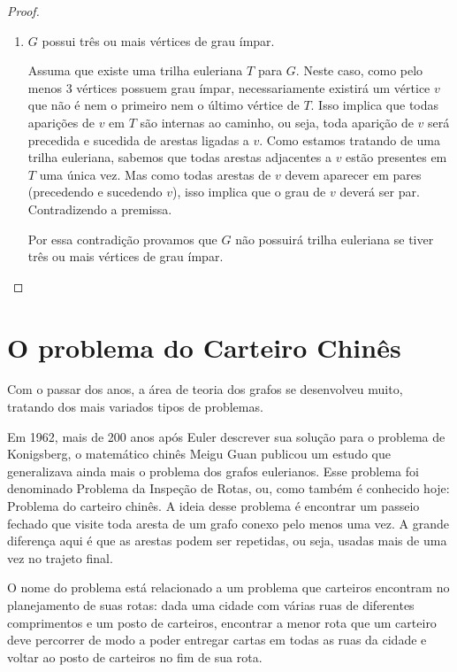 \documentclass{article}
\begin{document}
\begin{proof}
\begin{enumerate}
        \item $G$ possui três ou mais vértices de grau ímpar. 

			Assuma que existe uma trilha euleriana $T$ para $G$. 
			Neste caso, como pelo menos 3 vértices possuem grau ímpar, necessariamente existirá um vértice $v$ que não é nem o primeiro nem o último vértice de $T$.
			Isso implica que todas aparições de $v$ em $T$ são internas ao caminho, ou seja, toda aparição de $v$ será precedida e sucedida de arestas ligadas a $v$.
			Como estamos tratando de uma trilha euleriana, sabemos que todas arestas adjacentes a $v$ estão presentes em $T$ uma única vez. 
			Mas como todas arestas de $v$ devem aparecer em pares (precedendo e sucedendo $v$), isso implica que o grau de $v$ deverá ser par.
			Contradizendo a premissa.

			Por essa contradição provamos que $G$ não possuirá trilha euleriana se tiver três ou mais vértices de grau ímpar.
    \end{enumerate}
\end{proof}



%


\section{O problema do Carteiro Chinês}

Com o passar dos anos, a área de teoria dos grafos se desenvolveu muito, tratando dos mais variados tipos de problemas.

Em 1962, mais de 200 anos após Euler descrever sua solução para o problema de Konigsberg, o matemático chinês Meigu Guan publicou um estudo que generalizava ainda mais o problema dos grafos eulerianos. 
Esse problema foi denominado Problema da Inspeção de Rotas, ou, como também é conhecido hoje: Problema do carteiro chinês.
A ideia desse problema é encontrar um passeio fechado que visite toda aresta de um grafo conexo pelo menos uma vez. 
A grande diferença aqui é que as arestas podem ser repetidas, ou seja, usadas mais de uma vez no trajeto final.

O nome do problema está relacionado a um problema que carteiros encontram no planejamento de suas rotas: dada uma cidade com várias ruas de diferentes comprimentos e um posto de carteiros, encontrar a menor rota que um carteiro deve percorrer de modo a poder entregar cartas em todas as ruas da cidade e voltar ao posto de carteiros no fim de sua rota.
\end{document}
